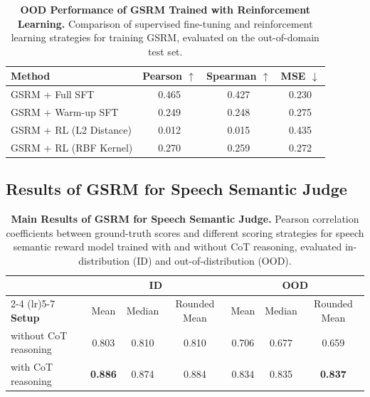 \begin{table}[!t]
\centering
\caption{\textbf{OOD Performance of GSRM Trained with Reinforcement Learning.} Comparison of supervised fine-tuning and reinforcement learning strategies for training GSRM, evaluated on the out-of-domain test set.}
\setlength{\tabcolsep}{3.5pt}
\begin{tabular}{l c c c}
\toprule[1.5pt]
\textbf{Method} 
& {\textbf{Pearson} $\uparrow$}
& {\textbf{Spearman} $\uparrow$}
& {\textbf{MSE} $\downarrow$} \\
\midrule
GSRM + Full SFT
& 0.465 & 0.427 & 0.230  \\
GSRM + Warm-up SFT
& 0.249 & 0.248 & 0.275  \\
GSRM + RL (L2 Distance) 
& 0.012 & 0.015 & 0.435  \\
GSRM + RL (RBF Kernel) 
& 0.270 & 0.259 & 0.272  \\
\bottomrule
\end{tabular}
\label{table:gsrm-rl-results}
\end{table}


\subsection{Results of GSRM for Speech Semantic Judge}
\label{sec: gtrm results}

\begin{table}[thb]
\centering
\caption{\textbf{Main Results of GSRM for Speech Semantic Judge.} Pearson correlation coefficients between ground-truth scores and different scoring strategies for speech semantic reward model trained with and without CoT reasoning, evaluated in-distribution (ID) and out-of-distribution (OOD).}
\label{tab: gtrm results}
\begin{tabular}{lccc|ccc}
\toprule
& \multicolumn{3}{c|}{\textbf{ID}} & \multicolumn{3}{c}{\textbf{OOD}} \\
\cmidrule(lr){2-4} \cmidrule(lr){5-7}
\textbf{Setup} & Mean & Median & Rounded Mean & Mean & Median & Rounded Mean \\
\midrule
without CoT reasoning
  & 0.803 & 0.810 & 0.810
  & 0.706 & 0.677 & 0.659 \\
with CoT reasoning
  & \textbf{0.886} & 0.874 & 0.884
  & 0.834 & 0.835 & \textbf{0.837} \\
\bottomrule
\end{tabular}
\end{table}

